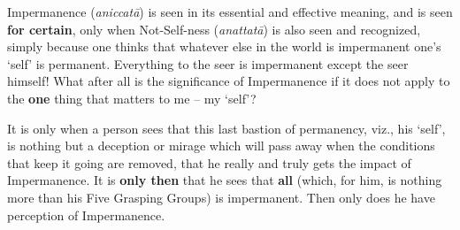 Impermanence (\emph{aniccatā}) is seen in its essential and effective meaning, and is seen \textbf{for certain}, only when Not-Self-ness (\emph{anattatā}) is also seen and recognized, simply because one thinks that whatever else in the world is impermanent one's `self' is permanent. Everything to the seer is impermanent except the seer himself! What after all is the significance of Impermanence if it does not apply to the \textbf{one} thing that matters to me -- my `self'?

It is only when a person sees that this last bastion of permanency, viz., his `self', is nothing but a deception or mirage which will pass away when the conditions that keep it going are removed, that he really and truly gets the impact of Impermanence. It is \textbf{only then} that he sees that \textbf{all} (which, for him, is nothing more than his Five Grasping Groups) is impermanent. Then only does he have perception of Impermanence.
